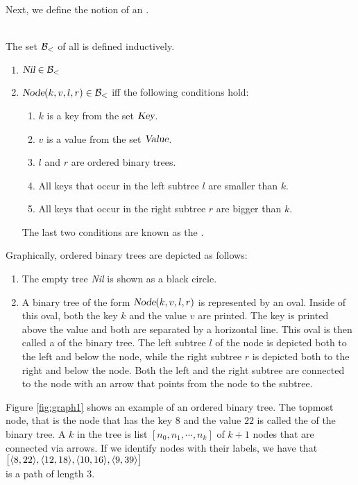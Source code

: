\noindent
Next, we define the notion of an  .
\begin{Definition} \hspace*{\fill} \\
  The set $\mathcal{B}_<$ of all  is defined inductively.
  \begin{enumerate}
  \item $\textsl{Nil} \in \mathcal{B}_<$
  \item $\textsl{Node}(k, v, l, r) \in \mathcal{B}_<$ \quad iff the following conditions hold:
        \begin{enumerate}
        \item $k$ is a key from the set $\textsl{Key}$.
        \item $v$ is a value from the set $\textsl{Value}$.
        \item $l$ and $r$ are ordered binary trees.
        \item All keys that occur in the left subtree $l$ are smaller than $k$.
        \item All keys that occur in the right subtree $r$ are bigger than $k$.
        \end{enumerate}
        The last two conditions are known as the .
        \eox
  \end{enumerate}
\end{Definition}
Graphically, ordered binary trees are depicted as follows:
\begin{enumerate}
\item The empty tree \textsl{Nil} is shown as a black circle.
\item A binary tree of the form $\textsl{Node}(k,v,l,r)$ is represented by an oval.  Inside of this
      oval, both the key $k$ and the value $v$ are printed.  The key is printed above the value and
      both are separated by a horizontal line.  This oval is then called a
       of the binary tree. 
      The left subtree $l$ of the node is depicted both to the left and  below the node,
      while the right subtree $r$ is depicted both to the right and below the node.  Both the left
      and the right subtree are connected to the node with an arrow that points from the node to the
      subtree.
\end{enumerate}
Figure \ref{fig:graph1} shows an example of an ordered binary tree.  The topmost node, that is the
node that has the key $8$ and the value $22$ is called the  of the binary tree.
A  $k$ in the tree is  list $[n_0,n_1, \cdots, n_k]$ of
$k+1$ nodes that are connected via arrows.  If we identify nodes with their labels, we have that
\\[0.2cm]
\hspace*{1.3cm} $\bigl[ \pair(8,22), \pair(12,18), \pair(10,16), \pair(9,39) \bigr]$ \\[0.2cm]
is a path of length 3.



